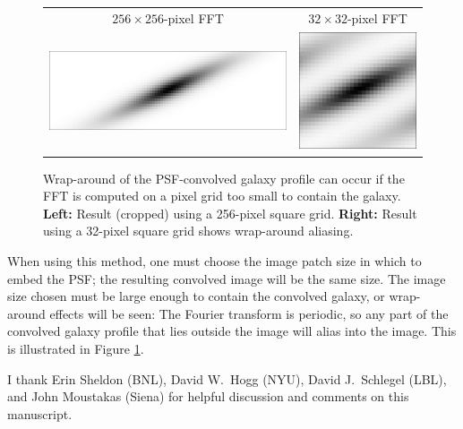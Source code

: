 \documentclass[11pt,preprint]{aastex}
\newcommand{\eqnref}[1]{Equation \ref{#1}}
\newcommand{\trick}{method}
\begin{document}
\begin{figure}
\begin{center}
\begin{tabular}{@{}cc@{}}
  $256 \times 256$-pixel FFT &
  $32 \times 32$-pixel FFT \\
  \includegraphics[height=0.22\textwidth]{gal-00} &
  \includegraphics[height=0.22\textwidth]{gal-01} \\
\end{tabular}
\end{center}
\caption{\label{fig:wrap}%
  Wrap-around of the PSF-convolved galaxy profile can occur if the FFT is
  computed on a pixel grid too small to contain the galaxy.
  \textbf{Left:} Result (cropped) using a 256-pixel square grid.
  \textbf{Right:} Result using a 32-pixel square grid shows wrap-around
  aliasing.
}
\end{figure}


When using this \trick, one must choose the image patch size in which
to embed the PSF; the resulting convolved image will be the same size.
The image size chosen must be large enough to contain the convolved
galaxy, or wrap-around effects will be seen: The Fourier transform is
periodic, so any part of the convolved galaxy profile that lies
outside the image will alias into the image.  This is
illustrated in Figure \ref{fig:wrap}.





\acknowledgements

I thank Erin Sheldon (BNL),
David W.~Hogg (NYU), David J.~Schlegel (LBL), and John Moustakas (Siena)
for helpful discussion and comments on this manuscript.
\end{document}
